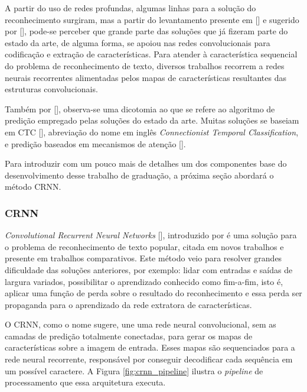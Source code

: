 A partir do uso de redes profundas, algumas linhas para a solução do reconhecimento surgiram, mas a partir do levantamento presente em [] 
e sugerido por [], pode-se perceber que grande parte das soluções que já fizeram parte do estado da arte, de alguma forma, se apoiou 
nas redes convolucionais para codificação e extração de características.
Para atender à característica sequencial do problema de reconhecimento de texto, diversos trabalhos recorrem a redes neurais recorrentes alimentadas pelos 
mapas de características resultantes das estruturas convolucionais.

Também por [], observa-se uma dicotomia ao que se refere ao algoritmo de predição empregado pelas soluções do estado da arte. 
Muitas soluções se baseiam em CTC [], abreviação do nome em inglês \textit{Connectionist Temporal Classification}, e predição baseados em 
mecanismos de atenção [].

Para introduzir com um pouco mais de detalhes um dos componentes base do desenvolvimento desse trabalho de graduação, a próxima seção abordará o método CRNN.


\subsubsection{CRNN} \label{crnn}
\textit{Convolutional Recurrent Neural Networks} [], introduzido por \citeauthor{CRNN} é uma solução para o problema de reconhecimento 
de texto popular, citada em novos trabalhos e presente em trabalhos comparativos. Este método veio para resolver grandes 
dificuldade das soluções anteriores, por exemplo: lidar com entradas e saídas de largura variados, possibilitar o aprendizado conhecido como fim-a-fim, 
isto é, aplicar uma função de perda sobre o resultado do reconhecimento e essa perda ser propaganda para o aprendizado da rede extratora de características.

O CRNN, como o nome sugere, une uma rede neural convolucional, sem as camadas de predição totalmente conectadas, para gerar os mapas de características 
sobre a imagem de entrada. Esses mapas são sequenciados para a rede neural recorrente, responsável por conseguir decodificar cada sequência em um possível 
caractere. A Figura \ref{fig:crnn_pipeline} ilustra o \textit{pipeline} de processamento que essa arquitetura executa.

